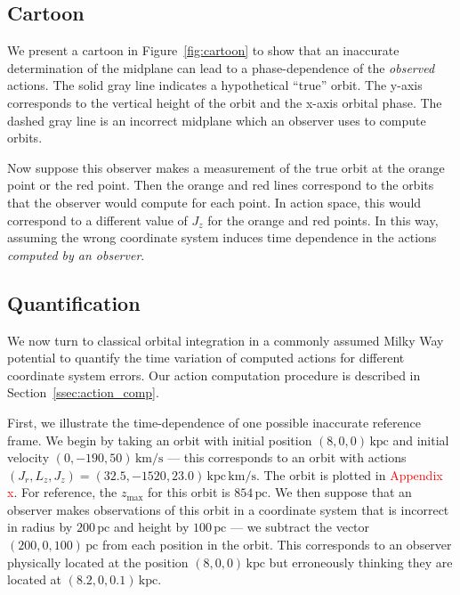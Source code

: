 \documentclass[twocolumn]{aastex62}
\newcommand{\Gus}[1]{\textcolor{red}{#1}}
\newcommand{\pc}{\text{pc}}
\newcommand{\kpc}{\text{kpc}}
\newcommand{\kms}{\text{km}/\text{s}}
\newcommand{\actunit}{\text{kpc}\,\kms}
\begin{document}
\subsection{Cartoon} \label{ssec:cartoon}
We present a cartoon in Figure~\ref{fig:cartoon} to show that an inaccurate
determination of the midplane can lead to a phase-dependence of the {\em
observed} actions. The solid gray line indicates a hypothetical ``true''
orbit. The y-axis corresponds to the vertical height of the orbit and the
x-axis orbital phase. The dashed gray line is an incorrect midplane which an
observer uses to compute orbits.

Now suppose this observer makes a measurement of the true orbit at the orange
point or the red point. Then the orange and red lines correspond to the orbits
that the observer would compute for each point. In action space, this would
correspond to a different value of $J_z$ for the orange and red points. In
this way, assuming the wrong coordinate system induces time dependence in the
actions {\em computed by an observer}.

\begin{figure*}
\caption{Caption.}
\label{fig:cartoon}
\end{figure*}

\subsection{Quantification} \label{ssec:quant}
We now turn to classical orbital integration in a commonly assumed Milky Way
potential to quantify the time variation of computed actions for different
coordinate system errors. Our action computation procedure is described in
Section~\ref{ssec:action_comp}.

First, we illustrate the time-dependence of one possible inaccurate reference
frame. We begin by taking an orbit with initial position $(8, 0, 0)\,\kpc$ and
initial velocity $(0, -190, 50)\,\kms$ --- this corresponds to an orbit with
actions $(J_r, L_z, J_z) = (32.5, -1520, 23.0)\,\actunit$. The orbit is
plotted in \Gus{Appendix x}. For reference, the $z_{\text{max}}$ for this
orbit is $854\,\pc$. We then suppose that an observer makes observations of
this orbit in a coordinate system that is incorrect in radius by $200\,\pc$
and height by $100\,\pc$ --- we subtract the vector $(200, 0, 100)\,\pc$ from
each position in the orbit. This corresponds to an observer physically located
at the position $(8, 0, 0)\,\kpc$ but erroneously thinking they are located at
$(8.2, 0, 0.1)\,\kpc$.
\end{document}
